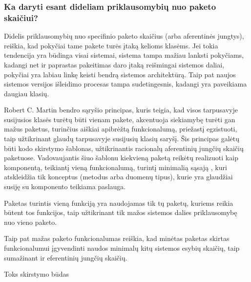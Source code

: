 \subsubsection{Ka daryti esant dideliam priklausomybių nuo paketo skaičiui?}
Didelis priklausomybių nuo specifinio paketo skaičius (arba aferentinės jungtys), reiškia, kad pokyčiai tame pakete turės įtaką kelioms klasėms.
Jei tokia tendencija yra būdinga visai sistemai, sistema tampa mažiau lanksti pokyčiams, kadangi net ir paprastas pakeitimas
daro įtaką reišmingai sistemos daliai, pokyčiai yra labiau linkę keisti bendrą sistemos architektūrą.
Taip pat naujos sistemos versijos išleidimo  procesas tampa sudetingesnis, kadangi yra paveikiama daugiau klasių.

Robert C. Martin bendro sąryšio principas, kuris teigia, kad visos tarpusavyje susijusios klasės turėtų būti vienam pakete,
akcentuoja siekiamybę turėti gan mažus paketus, turinčius aiškiai apibrėžtą funkcionalumą, priežastį egzistuoti, taip užtikrinant
glaudų tarpusavyje susijusių klasių saryšį.
Šis principas galėtų būti kodo skirstymo šablonas, užtikrinantis racionalų aferentinių jungčių skaičių paketuose.
Vadovaujantis šiuo šablonu kiekvieną paketą reikėtų realizuoti kaip komponentą, teikiantį vieną funkcionalumą,
turintį minimalią sąsają , kuri atskleidžia tik konceptus (metodus arba duomenų tipus),
kurie yra glaudžiai susiję su komponento teikiama paslauga.

Paketas turintis vieną funkciją yra naudojamas tik tų paketų, kuriems reikia būtent tos funkcijos,
taip užtikrinant tik mažos sistemos dalies priklausomybę nuo vieno paketo.

Taip pat mažas paketo funkcionalumas reiškia, kad minėtas paketas skirtas funkcionalumui įgyvendinti naudos minimalų kitų sistemos esybių skaičių,
taip sumažinant ir eferentinių jungčių skaičių.

Toks skirstymo būdas

